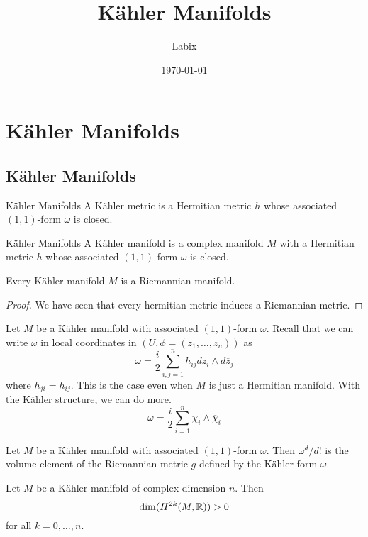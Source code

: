 \documentclass[a4paper]{article}
\title{Kähler Manifolds}
\author{Labix}
\date{\today}
\begin{document}
\maketitle
\begin{abstract}
\end{abstract}
\pagebreak
\tableofcontents
\pagebreak

\section{Kähler Manifolds}
\subsection{Kähler Manifolds}
\begin{defn}{Kähler Manifolds}{} A Kähler metric is a Hermitian metric $h$ whose associated $(1,1)$-form $\omega$ is closed. 
\end{defn}

\begin{defn}{Kähler Manifolds}{} A Kähler manifold is a complex manifold $M$ with a Hermitian metric $h$ whose associated $(1,1)$-form $\omega$ is closed. 
\end{defn}

\begin{prp}{}{} Every Kähler manifold $M$ is a Riemannian manifold. \tcbline
\begin{proof}
We have seen that every hermitian metric induces a Riemannian metric. 
\end{proof}
\end{prp}

Let $M$ be a Kähler manifold with associated $(1,1)$-form $\omega$. Recall that we can write $\omega$ in local coordinates in $(U,\phi=(z_1,\dots,z_n))$ as $$\omega=\frac{i}{2}\sum_{i,j=1}^nh_{ij}dz_i\wedge d\overline{z}_j$$ where $h_{ji}=\overline{h}_{ij}$. This is the case even when $M$ is just a Hermitian manifold. With the Kähler structure, we can do more. $$\omega=\frac{i}{2}\sum_{i=1}^n\chi_i\wedge \overline{\chi}_i$$

\begin{prp}{}{} Let $M$ be a Kähler manifold with associated $(1,1)$-form $\omega$. Then $\omega^d/d!$ is the volume element of the Riemannian metric $g$ defined by the Kähler form $\omega$. 
\end{prp}

\begin{prp}{}{} Let $M$ be a Kähler manifold of complex dimension $n$. Then $$\dim(H^{2k}(M,\mathbb{R}))>0$$ for all $k=0,\dots,n$. 
\end{prp}
\end{document}
